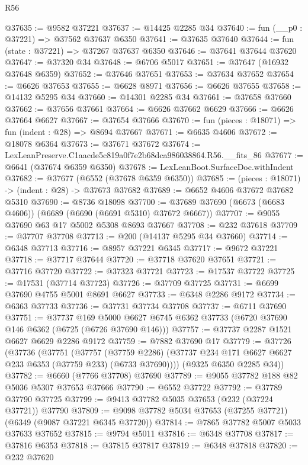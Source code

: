 \begin{lexlean}{R56}
\begin{coremodule}
@37635 := @9582 @37221
@37637 := @14425 @2285 @34
@37640 := fun (__p0 : @37221) => @37562 @37637 @6350
@37641 := @37635 @37640
@37644 := fun (state : @37221) => @37267 @37637 @6350
@37646 := @37641 @37644 @37620
@37647 := @37320 @34
@37648 := @6706 @5017
@37651 := @37647 (@16932 @37648 @6359)
@37652 := @37646 @37651
@37653 := @37634 @37652
@37654 := @6626 @37653
@37655 := @6628 @8971
@37656 := @6626 @37655
@37658 := @14132 @5295 @34
@37660 := @14301 @2285 @34
@37661 := @37658 @37660
@37662 := @37656 @37661
@37664 := @6626 @37662 @6629
@37666 := @6626 @37664 @6627
@37667 := @37654 @37666
@37670 := fun (pieces : @18071) => fun (indent : @28) => @8694 @37667
@37671 := @6635 @4606
@37672 := @18078 @6364
@37673 := @37671 @37672
@37674 := LexLeanPreserve.C1aacde5c819a0f7e2b68dca986038864.R56.__fits_86
@37677 := @6641 (@37674 @6359 @6350)
@37678 := LexLeanBoot.SurfaceDoc.withIndent
@37682 := @37677 (@6552 (@37678 @6359 @6350))
@37685 := (pieces : @18071) -> (indent : @28) -> @37673 @37682
@37689 := @6652 @4606 @37672 @37682 @5310
@37690 := @8736 @18098
@37700 := @37689 @37690 (@6673 (@6683 @4606)) (@6689 (@6690 (@6691 @5310) @37672 @6667))
@37707 := @9055 @37690 @63 @17 @5002 @5308 @8693 @37667
@37708 := @232 @37618
@37709 := @37707 @37708
@37713 := @200 (@14137 @5295 @34 @37660)
@37714 := @6348 @37713
@37716 := @8957 @37221 @6345
@37717 := @9672 @37221
@37718 := @37717 @37644
@37720 := @37718 @37620 @37651
@37721 := @37716 @37720
@37722 := @37323 @37721
@37723 := @17537 @37722
@37725 := @17531 (@37714 @37723)
@37726 := @37709 @37725
@37731 := @6699 @37690 @4755 @5001 @8691 @6627
@37733 := @6348 @2286 @9172
@37734 := @6363 @37733
@37736 := @37731 @37734 @37708
@37737 := @6711 @37690
@37751 := @37737
    @169
    @5000
    @6627
    @6745
    @6362
    @37733
    (@6720 @37690 @146 @6362 (@6725 (@6726 @37690 @146)))
@37757 := @37737 @2287 @1521 @6627 @6629 @2286 @9172
@37759 := @7882 @37690 @17
@37779 := @37726
    (@37736
      (@37751
        (@37757
          (@37759 @2286)
          (@37737 @234 @171 @6627 @6627 @233 @6353 (@37759 @233) (@6733 @37690))))
      (@9325 @6350 @2285 @34))
@37782 := @6660 (@7766 @37708) @37690
@37789 := @9055 @37782 @188 @82 @5036 @5307 @37653 @37666
@37790 := @6552 @37722
@37792 := @37789 @37790 @37725
@37799 := @9413 @37782 @5035 @37653 (@232 (@37224 @37721)) @37790
@37809 := @9098 @37782 @5034 @37653 (@37255 @37721) (@6349 (@9087 @37221 @6345 @37720))
@37814 := @7865 @37782 @5007 @5033 @37633 @37652
@37815 := @9794 @5011
@37816 := @6348 @37708
@37817 := @37816 @6353
@37818 := @37815 @37817
@37819 := @6348 @37818
@37820 := @232 @37620

\end{coremodule}
\end{lexlean}
